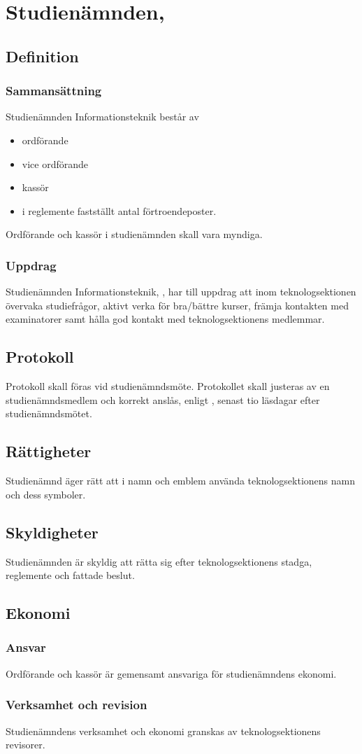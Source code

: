 \section{Studienämnden, \SNIT}

\subsection{Definition}

\subsubsection{Sammansättning}
Studienämnden Informationsteknik består av 
\begin{itemize}
    \item ordförande
    \item vice ordförande
    \item kassör
    \item i reglemente fastställt antal förtroendeposter.
\end{itemize}

Ordförande och kassör i studienämnden skall vara myndiga.

\subsubsection{Uppdrag}
Studienämnden Informationsteknik, \SNIT{}, har till uppdrag att inom teknologsektionen övervaka studiefrågor, aktivt verka för bra/bättre kurser, främja kontakten med examinatorer samt hålla god kontakt med teknologsektionens medlemmar.

\subsection{Protokoll}
Protokoll skall föras vid studienämndsmöte. Protokollet skall justeras av en studienämndsmedlem och korrekt anslås, enligt , senast tio läsdagar efter studienämndsmötet.

\subsection{Rättigheter}
Studienämnd äger rätt att i namn och emblem använda teknologsektionens namn och dess symboler.

\subsection{Skyldigheter}
Studienämnden är skyldig att rätta sig efter teknologsektionens stadga, reglemente och fattade beslut.

\subsection{Ekonomi}
\subsubsection{Ansvar}
Ordförande och kassör är gemensamt ansvariga för studienämndens ekonomi.
\subsubsection{Verksamhet och revision}
Studienämndens verksamhet och ekonomi granskas av teknologsektionens revisorer.